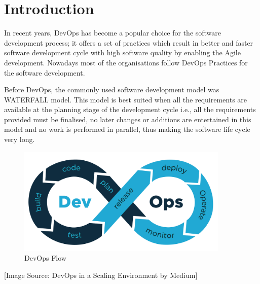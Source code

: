 \documentclass[12pt]{article}
\begin{document}
	
	
	\newpage
	\tableofcontents
	\newpage
	\listoffigures
	\newpage
	\section{Introduction}
	
In recent years, DevOps has become a popular choice for the software development process; it offers a set of practices which result in better and faster software development cycle with high software quality by enabling the Agile development. Nowadays most of the organisations follow DevOps Practices for the software development.

Before DevOps, the commonly used software development model was WATERFALL model. This model is best suited when all the requirements are available at the planning stage of the development cycle i.e., all the requirements provided must be finalised, no later changes or additions are entertained in this model and no work is performed in parallel, thus making the software life cycle very long.

\begin{figure}[htbp]
\begin{center}
\includegraphics[width=0.9\textwidth]{devops.png}
\end{center}
\caption{DevOps Flow}
\end{figure}
\begin{center}
\tiny [Image Source: DevOps in a Scaling Environment by Medium]
\end{center}
\end{document}
